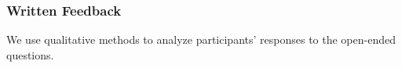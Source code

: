 




\subsubsection{Written Feedback}

 
We use qualitative methods to analyze participants' responses to the open-ended questions. 





\clearpage

